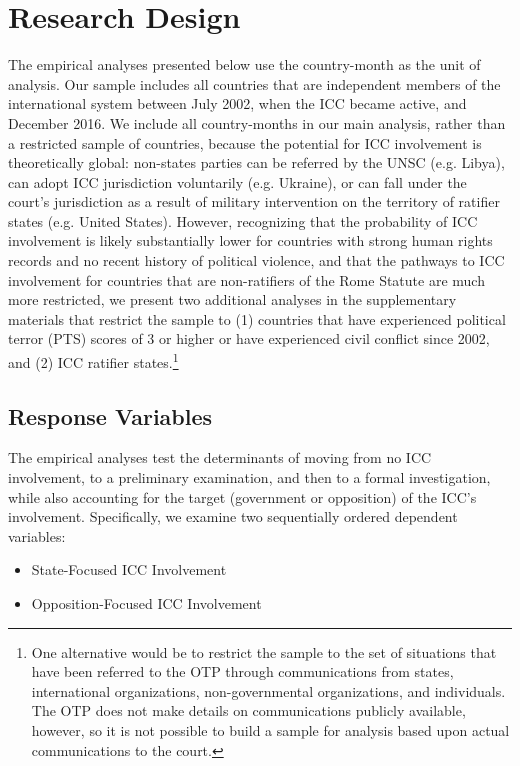 \section*{Research Design}

The empirical analyses presented below use the country-month as the unit of analysis. Our sample includes all countries that are independent members of the international system between July 2002, when the ICC became active, and December 2016. We include all country-months in our main analysis, rather than a restricted sample of countries, because the potential for ICC involvement is theoretically global: non-states parties can be referred by the UNSC (e.g. Libya), can adopt ICC jurisdiction voluntarily (e.g. Ukraine), or can fall under the court's jurisdiction as a result of military intervention on the territory of ratifier states (e.g. United States). However, recognizing that the probability of ICC involvement is likely substantially lower for countries with strong human rights records and no recent history of political violence, and that the pathways to ICC involvement for countries that are non-ratifiers of the Rome Statute are much more restricted, we present two additional analyses in the supplementary materials that restrict the sample to (1) countries that have experienced political terror (PTS) scores of 3 or higher or have experienced civil conflict since 2002, and (2) ICC ratifier states.\footnote{One alternative would be to restrict the sample to the set of situations that have been referred to the OTP through communications from states, international organizations, non-governmental organizations, and individuals. The OTP does not make details on communications publicly available, however, so it is not possible to build a sample for analysis based upon actual communications to the court.}

\subsection{Response Variables}

The empirical analyses test the determinants of moving from no ICC involvement, to a preliminary examination, and then to a formal investigation, while also accounting for the target (government or opposition) of the ICC's involvement. Specifically, we examine two sequentially ordered dependent variables:

\begin{itemize}
	\item State-Focused ICC Involvement
	\item Opposition-Focused ICC Involvement
\end{itemize}

